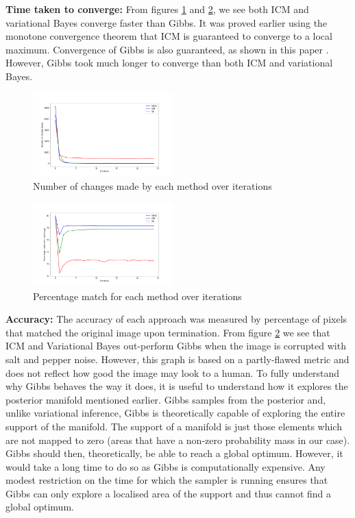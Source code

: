 \documentclass[10pt, a4paper, twocolumn]{article} %
\begin{document}
\noindent \textbf{Time taken to converge:}
 From figures \ref{fig:MethodComparisonChanges} and \ref{fig:MethodComparisonMatch}, we see both ICM and variational Bayes converge faster than Gibbs. It was proved earlier using the monotone convergence theorem that ICM is guaranteed to converge to a local maximum. Convergence of Gibbs is also guaranteed, as shown in this paper \cite{roberts1994simple}. However, Gibbs took much longer to converge than both ICM and variational Bayes. 
 \begin{figure}
     \centering
     \includegraphics[width=0.48\textwidth]{images/AllComparisonChanges.png}
     \caption{Number of changes made by each method over iterations}
     \label{fig:MethodComparisonChanges}
 \end{figure}
 \begin{figure}
     \centering
     \includegraphics[width=0.48\textwidth]{images/AllComparisonMatchSnP.png}
     \caption{Percentage match for each method over iterations}
     \label{fig:MethodComparisonMatch}
 \end{figure}

\noindent\textbf{Accuracy:}
The accuracy of each approach was measured by percentage of pixels that matched the original image upon termination. From figure \ref{fig:MethodComparisonMatch} we see that ICM and Variational Bayes out-perform Gibbs when the image is corrupted with salt and pepper noise. However, this graph is based on a partly-flawed metric and does not reflect how good the image may look to a human. 
To fully understand why Gibbs behaves the way it does, it is useful to understand how it explores the posterior manifold mentioned earlier. Gibbs samples from the posterior and, unlike variational inference, Gibbs is theoretically capable of exploring the entire support of the manifold. The support of a manifold is just those elements which are not mapped to zero (areas that have a non-zero probability mass in our case). Gibbs should then, theoretically, be able to reach a global optimum. However, it would take a long time to do so as Gibbs is computationally expensive. Any modest restriction on the time for which the sampler is running ensures that Gibbs can only explore a localised area of the support and thus cannot find a global optimum.
\end{document}
